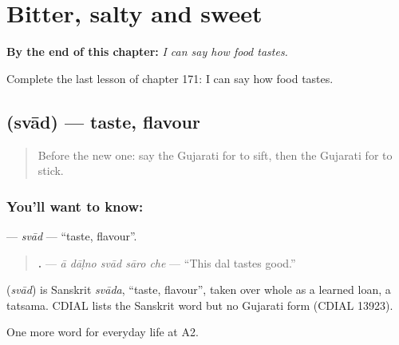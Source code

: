 
\chapter{Bitter, salty and sweet}
\label{ch:gu-bitter-salty-and-sweet}

\begin{chapteropening}
\textbf{By the end of this chapter:} \emph{I can say how food tastes.}

Complete the last lesson of chapter 171: I can say how food tastes.
\end{chapteropening}

\section[\texorpdfstring{\gu{સ્વાદ} (svād)}{સ્વાદ (svād)}]{ (svād) — taste, flavour}

\label{lesson:GU-C171-svad}



\begin{quote}
Before the new one: say the Gujarati for to sift, then the Gujarati for to stick.
\end{quote}

\subsection*{You'll want to know: }
\textbf{} — \emph{svād} — \textquotedblleft{}taste, flavour\textquotedblright{}.

\begin{quote}
\textbf{    .} — \emph{ā dāḷno svād sāro che} — \textquotedblleft{}This dal tastes good.\textquotedblright{}
\end{quote}

\begin{cousinweb}
\textbf{} (\emph{svād}) is Sanskrit \emph{svāda}, \textquotedblleft{}taste, flavour\textquotedblright{}, taken over whole as a learned loan, a tatsama. CDIAL lists the Sanskrit word but no Gujarati form (CDIAL 13923).
\end{cousinweb}

\begin{grammarlens}[title={What you've built}]
One more word for everyday life at A2.
\end{grammarlens}

